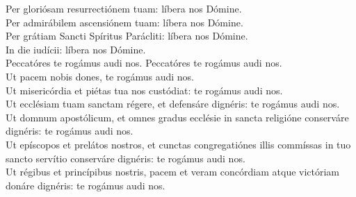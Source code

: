 {	%
		Per gloriósam resurrectiónem tuam: líbera nos Dómine. \\
	Per admirábilem ascensiónem tuam: líbera nos Dómine. \\
		Per grátiam Sancti Spíritus Parácliti: líbera nos Dómine. \\
	In die iudícii: líbera nos Dómine. \\
	Peccatóres te rogámus audi nos. \R Peccatóres te rogámus audi nos. \\
		Ut pacem nobis dones, \R te rogámus audi nos. \\
		Ut misericórdia et piétas tua nos custódiat: te rogámus audi nos. \\
		Ut ecclésiam tuam sanctam régere, et defensáre dignéris: te rogámus audi nos. \\
		Ut domnum apostólicum, et omnes gradus ecclésie in sancta religióne conserváre dignéris: te rogámus audi nos. \\
		Ut epíscopos et prelátos nostros, et cunctas congregatiónes illis commíssas in tuo sancto servítio conserváre dignéris: te rogámus audi nos. \\
		Ut régibus et princípibus nostris, pacem et veram concórdiam atque victóriam donáre dignéris: te rogámus audi nos. \\
}
